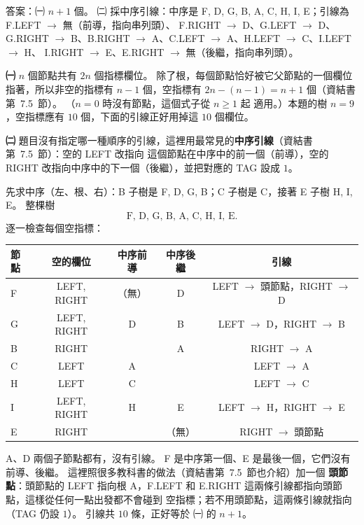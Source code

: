 \begin{pastsoln}
答案：㈠ $n + 1$ 個。 ㈡ 採中序引線：中序是 F, D, G, B, A, C, H, I, E；引線為 F.LEFT $\to$ 無（前導，指向串列頭）、
F.RIGHT $\to$ D、G.LEFT $\to$ D、G.RIGHT $\to$ B、B.RIGHT $\to$ A、C.LEFT $\to$ A、H.LEFT $\to$ C、I.LEFT $\to$ H、
I.RIGHT $\to$ E、E.RIGHT $\to$ 無（後繼，指向串列頭）。

\textbf{㈠} $n$ 個節點共有 $2n$ 個指標欄位。 除了根，每個節點恰好被它父節點的一個欄位指著，所以非空的指標有
$n - 1$ 個，空指標有 $2n - (n - 1) = n + 1$ 個（資結書第~7.5~節）。 （$n = 0$ 時沒有節點，這個式子從 $n \ge 1$ 起
適用。）本題的樹 $n = 9$，空指標應有 $10$ 個，下面的引線正好用掉這 $10$ 個欄位。

\textbf{㈡} 題目沒有指定哪一種順序的引線，這裡用最常見的\textbf{中序引線}（資結書第~7.5~節）：空的 LEFT 改指向
這個節點在中序中的前一個（前導），空的 RIGHT 改指向中序中的下一個（後繼），並把對應的 TAG 設成 $1$。

先求中序（左、根、右）：B 子樹是 F, D, G, B；C 子樹是 C，接著 E 子樹 H, I, E。 整棵樹
\[
\text{F, D, G, B, A, C, H, I, E}.
\]
逐一檢查每個空指標：
\begin{center}
\small
\begin{tabular}{lcccc}
\toprule
節點 & 空的欄位 & 中序前導 & 中序後繼 & 引線 \\
\midrule
F & LEFT, RIGHT & （無） & D & LEFT $\to$ 頭節點，RIGHT $\to$ D \\
G & LEFT, RIGHT & D & B & LEFT $\to$ D，RIGHT $\to$ B \\
B & RIGHT & & A & RIGHT $\to$ A \\
C & LEFT & A & & LEFT $\to$ A \\
H & LEFT & C & & LEFT $\to$ C \\
I & LEFT, RIGHT & H & E & LEFT $\to$ H，RIGHT $\to$ E \\
E & RIGHT & & （無） & RIGHT $\to$ 頭節點 \\
\bottomrule
\end{tabular}
\end{center}
A、D 兩個子節點都有，沒有引線。 F 是中序第一個、E 是最後一個，它們沒有前導、後繼。 這裡照很多教科書的做法（資結書第~7.5~節也介紹）加一個
\textbf{頭節點}：頭節點的 LEFT 指向根 A，F.LEFT 和 E.RIGHT 這兩條引線都指向頭節點，這樣從任何一點出發都不會碰到
空指標；若不用頭節點，這兩條引線就指向 \NIL（TAG 仍設 $1$）。 引線共 $10$ 條，正好等於 ㈠ 的 $n + 1$。


\end{pastsoln}
